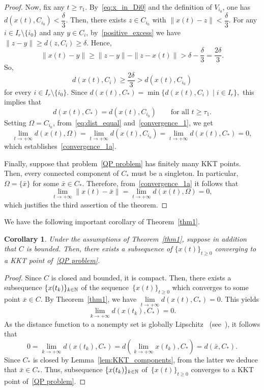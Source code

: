 \documentclass[11pt]{article}
\newtheorem{corollary}[theorem]{Corollary}
\theoremstyle{definition}
\theoremstyle{remark}
\def\N{\Bbb N}
\begin{document}
\begin{proof}
	 	
	Now, fix any $t\geq \tau_1$. By~\eqref{eq:x_in_Di0} and the definition of $V_{i_0}$, one has $d(x(t),C_{i_0})<\dfrac{\delta}{3}$. Then, there exists $z\in C_{i_0}$ with $\|x(t)-z\|<\dfrac{\delta}{3}$. For any $i\in I_r\setminus\{i_0\}$ and any $y\in C_i$, by~\eqref{positive_excess} we have $\|z-y\|\geq d(z,C_i)\geq \delta$. Hence,
	\begin{equation*}
		\|x(t)-y\|\geq \|z-y\|-\|z-x(t)\|>\delta-\frac{\delta}{3}=\frac{2\delta}{3}.
	\end{equation*}
So, $$d(x(t),C_i)\geq \dfrac{2\delta}{3}> d(x(t),C_{i_0})$$ for every $i\in I_r\setminus\{i_0\}$. Since $d(x(t),C_*)=\min\{d(x(t),C_i)\mid i\in I_r\},$
	this implies that
	\begin{equation}\label{eq:dist_equal}
		d(x(t),C_*)=d(x(t),C_{i_0})\qquad\text{for all } t\geq \tau_1.
	\end{equation}
	Setting $\Omega=C_{i_0}$, from~\eqref{eq:dist_equal} and~\eqref{convergence_1}, we get
	\begin{equation*}
		\lim_{t\to+\infty} d(x(t),\Omega)=\lim_{t\to+\infty} d(x(t),C_{i_0})=\lim_{t\to+\infty} d(x(t),C_*)=0,
	\end{equation*}
	which establishes~\eqref{convergence_1a}.
	
	Finally, suppose that problem~\eqref{QP problem} has finitely many KKT points. Then, every connected component of $C_*$ must be a singleton. In particular, $\Omega=\{\bar x\}$
	for some $\bar x\in C_*$. Therefore, from~\eqref{convergence_1a} it follows that
	\begin{equation*}
		\lim_{t\to+\infty}\|x(t)-\bar x\|=\lim_{t\to+\infty} d(x(t),\Omega)=0,
	\end{equation*} which justifies the third assertion of the theorem. 
	\end{proof}

We have the following important corollary of Theorem~\ref{thm1}.

\begin{corollary}\label{cor1}
Under the assumptions of Theorem~\ref{thm1}, suppose in addition that $C$ is bounded. Then, there exists a subsequence of $\{x(t)\}_{t\geq 0}$ converging to a KKT point of~\eqref{QP problem}.
\end{corollary}

\begin{proof}
Since $C$ is closed and bounded, it is compact. Then, there exists a subsequence $\{x(t_k)\}_{k\in\N}$ of the sequence~$\{x(t)\}_{t\geq 0}$ which converges to some point $\bar x\in C$. By Theorem~\ref{thm1}, we have $\lim\limits_{t\to +\infty} d(x(t),C_*) = 0.$ This yields
$$\lim\limits_{k\to+\infty} d(x(t_k),C_*) = 0.$$
As the distance function to a nonempty set is globally Lipschitz~ (see~\cite[Proposition~2.4.1]{Clarke_1990}), it follows  that
 $$0=\lim\limits_{k\to+\infty} d(x(t_k),C_*)=d\left(\lim\limits_{k\to+\infty}x(t_k),C_*\right) = d(\bar x, C_*).$$
Since $C_*$ is closed by Lemma~\ref{lem:KKT_components},  from the latter we deduce that $\bar x\in C_*$.  Thus, subsequence $\{x(t_k)\}_{k\in\N}$ of~$\{x(t)\}_{t\geq 0}$ converges to a KKT point of~\eqref{QP problem}.
\end{proof}
\end{document}
